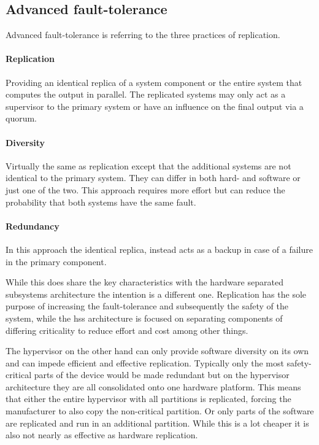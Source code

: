 \subsection{Advanced fault-tolerance} \label{advanced-fault-tolerance}
Advanced fault-tolerance is referring to the three practices of replication.
\paragraph{Replication} Providing an identical replica of a system component or the entire system that computes the output in parallel. The replicated systems may only act as a supervisor to the primary system or have an influence on the final output via a quorum.
\paragraph{Diversity} Virtually the same as replication except that the additional systems are not identical to the primary system. They can differ in both hard- and software or just one of the two. This approach requires more effort but can reduce the probability that both systems have the same fault. 
\paragraph{Redundancy} In this approach the identical replica, instead acts as a backup in case of a failure in the primary component.

While this does share the key characteristics with the hardware separated subsystems architecture the intention is a different one. 
Replication has the sole purpose of increasing the fault-tolerance and subsequently the safety of the system, while the \acrshort{hss} architecture is focused on separating components of differing criticality to reduce effort and cost among other things.

The hypervisor on the other hand can only provide software diversity on its own and can impede efficient and effective replication. Typically only the most safety-critical parts of the device would be made redundant but on the hypervisor architecture they are all consolidated onto one hardware platform. This means that either the entire hypervisor with all partitions is replicated, forcing the manufacturer to also copy the non-critical partition. Or only parts of the software are replicated and run in an additional partition. While this is a lot cheaper it is also not nearly as effective as hardware replication.
